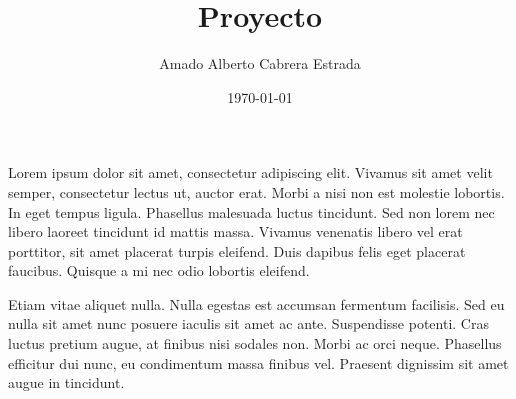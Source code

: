 \documentclass[spanish]{CabesHW}
\institute{Escuela de Ciencias Físicas y Matemática}
\title{Proyecto}
\author{Amado Alberto Cabrera Estrada}
\date{\today} %
\begin{document}
\maketitle

\begin{prob}
Lorem ipsum dolor sit amet, consectetur adipiscing elit. Vivamus sit amet velit semper, consectetur lectus ut, auctor erat. Morbi a nisi non est molestie lobortis. In eget tempus ligula. Phasellus malesuada luctus tincidunt. Sed non lorem nec libero laoreet tincidunt id mattis massa. Vivamus venenatis libero vel erat porttitor, sit amet placerat turpis eleifend. Duis dapibus felis eget placerat faucibus. Quisque a mi nec odio lobortis eleifend.
\end{prob}
Etiam vitae aliquet nulla. Nulla egestas est accumsan fermentum facilisis. Sed eu nulla sit amet nunc posuere iaculis sit amet ac ante. Suspendisse potenti. Cras luctus pretium augue, at finibus nisi sodales non. Morbi ac orci neque. Phasellus efficitur dui nunc, eu condimentum massa finibus vel. Praesent dignissim sit amet augue in tincidunt.
\end{document}
